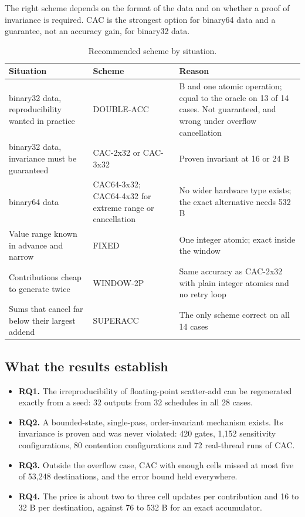 \documentclass[journal]{IEEEtran}
\begin{document}
The right scheme depends on the format of the data and on whether a
proof of invariance is required. CAC is the strongest option for
binary64 data and a guarantee, not an accuracy gain, for binary32 data.

\begin{table}[!htbp]\centering\small\setlength{\tabcolsep}{4pt}
\caption{Recommended scheme by situation.}\label{tab:22}
\begin{tabularx}{\linewidth}{>{\raggedright\arraybackslash\hsize=1.000\hsize}X>{\raggedright\arraybackslash\hsize=1.000\hsize}X>{\raggedright\arraybackslash\hsize=1.000\hsize}X}
\toprule
Situation & Scheme & Reason \\
\midrule
binary32 data, reproducibility wanted in practice & DOUBLE-ACC & 8 B and one atomic operation; equal to the oracle on 13 of 14 cases. Not
guaranteed, and wrong under overflow cancellation \\
binary32 data, invariance must be guaranteed & CAC-2x32 or CAC-3x32 & Proven invariant at 16 or 24 B \\
binary64 data & CAC64-3x32; CAC64-4x32 for extreme range or cancellation & No wider hardware type exists; the exact alternative needs 532 B \\
Value range known in advance and narrow & FIXED & One integer atomic; exact inside the window \\
Contributions cheap to generate twice & WINDOW-2P & Same accuracy as CAC-2x32 with plain integer atomics and no retry loop \\
Sums that cancel far below their largest addend & SUPERACC & The only scheme correct on all 14 cases \\
\bottomrule
\end{tabularx}
\end{table}

\hypertarget{what-the-results-establish}{%
\subsection{What the results
establish}\label{what-the-results-establish}}

\begin{itemize}
\item
  \textbf{RQ1.} The irreproducibility of floating-point scatter-add can
  be regenerated exactly from a seed: 32 outputs from 32 schedules in
  all 28 cases.
\item
  \textbf{RQ2.} A bounded-state, single-pass, order-invariant mechanism
  exists. Its invariance is proven and was never violated: 420 gates,
  1,152 sensitivity configurations, 80 contention configurations and 72
  real-thread runs of CAC.
\item
  \textbf{RQ3.} Outside the overflow case, CAC with enough cells missed
  at most five of 53,248 destinations, and the error bound held
  everywhere.
\item
  \textbf{RQ4.} The price is about two to three cell updates per
  contribution and 16 to 32 B per destination, against 76 to 532 B for
  an exact accumulator.
\end{itemize}
\end{document}

